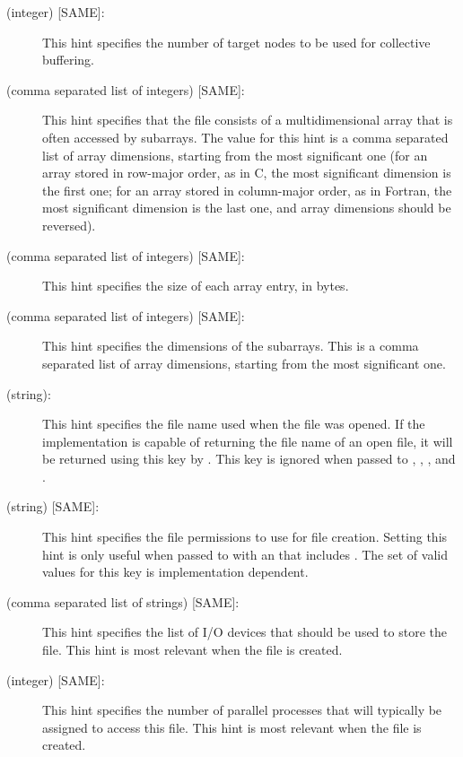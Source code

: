 \begin{description}
\item[ (integer) {[SAME]}:]
This hint specifies the number of target nodes to be used
for collective buffering.

\item[ (comma separated list of integers) {[SAME]}:]
This hint specifies that the file consists of a multidimensional
array that is often accessed by subarrays.
The value for this hint is a comma separated list of array dimensions,
starting from the most significant one
(for an array stored in row-major order, as in C,
the most significant dimension is the first one;
for an array stored in column-major order, as in Fortran,
the most significant dimension is the last one,
and array dimensions should be reversed).

\item[ (comma separated list of integers) {[SAME]}:]
This hint specifies the size of each array entry, in bytes.

\item[ (comma separated list of integers) {[SAME]}:]
This hint specifies the dimensions of the subarrays.
This is a comma separated list of array dimensions,
starting from the most significant one.

\item[ (string):]
This hint specifies the file name used when the file was opened.
If the implementation is capable of returning the file name
of an open file,
it will be returned using this key by .
This key is ignored when passed to
, , 
, and .

\item[ (string) {[SAME]}:]
This hint specifies the file permissions to use for file creation.
Setting this hint is only useful when passed to 
with an  that includes .
The set of valid values for this key is implementation dependent.

\item[ (comma separated list of strings) {[SAME]}:]
This hint specifies the list of I/O devices
that should be used to store the file.
This hint is most relevant when the file is created.

\item[ (integer) {[SAME]}:]
This hint specifies the number of parallel processes that will
typically be assigned to access this file.
This hint is most relevant when the file is created.


\end{description}
